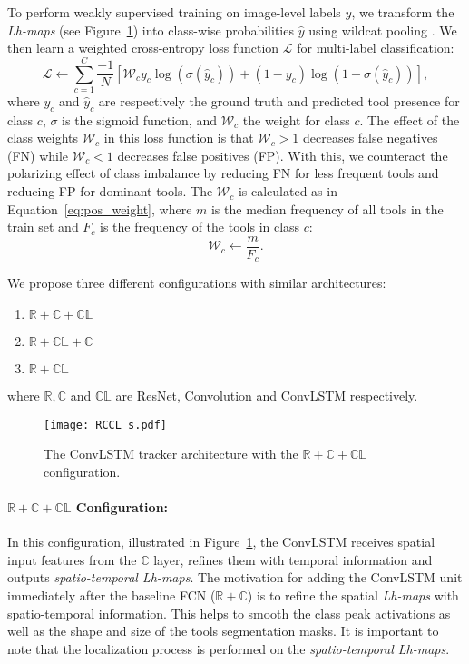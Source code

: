 \documentclass{svjour3}                     \smartqed
\newcommand{\bd}[1]{\textbf{#1}}
\begin{document}
To perform weakly supervised training on image-level labels $y$, we transform the \emph{Lh-maps} (see Figure~\ref{fig:RCCL}) into class-wise probabilities $\hat{y}$ using wildcat pooling \cite{cvpr:durand2017wildcat}.
We then learn a weighted cross-entropy loss function $\mathcal{L}$ for multi-label classification:
\begin{equation}\label{eq:loss}
\mathcal{L} \longleftarrow \sum_{c=1}^C\frac{-1}{N}\left [ \mathcal{W}_c y_c \log(\sigma(\hat{y}_c)) + (1-y_c) \log(1-\sigma(\hat{y}_c)) \right],
\end{equation}
where $y_c$ and $\hat{y}_c$ are respectively the ground truth and predicted tool presence for class $c$, $\sigma$ is the sigmoid function, and $\mathcal{W}_c$ the weight for class $c$. 
The effect of the class weights $\mathcal{W}_c$ in this loss function is that $\mathcal{W}_c > 1$ decreases false negatives (FN) while $\mathcal{W}_c < 1$ decreases false positives (FP). With this, we counteract the polarizing effect of class imbalance by reducing FN for less frequent tools and reducing FP for dominant tools. The $\mathcal{W}_c$ is calculated as in Equation~\ref{eq:pos_weight}, where $m$ is the median frequency of all tools in the train set and $F_c$ is the frequency of the tools in class $c$:
\begin{equation}\label{eq:pos_weight}
    \mathcal{W}_c \longleftarrow \frac{m}{F_c}.
\end{equation}

We propose three different configurations with similar architectures:
\begin{enumerate}
\item $\mathbb{R+C+CL}$
\item $\mathbb{R+CL+C}$
\item $\mathbb{R+CL}$
\end{enumerate}
where $\mathbb{R, C}$ and $\mathbb{CL}$ are ResNet, Convolution and ConvLSTM respectively.
\begin{figure}[t]\centering
        \texttt{[image: RCCL\_s.pdf]}
        \caption{The ConvLSTM tracker architecture with the $\mathbb{R+C+CL}$ configuration.}
    \label{fig:RCCL}
\end{figure}
\paragraph{$\mathbb{R+C+CL}$ \bd{Configuration}:} In this configuration, illustrated in Figure~\ref{fig:RCCL}, the ConvLSTM receives spatial input features from the $\mathbb{C}$ layer, refines them with temporal information and outputs \emph{spatio-temporal Lh-maps}. The motivation for adding the ConvLSTM unit immediately after the baseline FCN ($\mathbb{R+C}$) is to refine the spatial \emph{Lh-maps} with spatio-temporal information. This helps to smooth the class peak activations as well as the shape and size of the tools segmentation masks. It is important to note that the localization process is performed on the \textit{spatio-temporal Lh-maps}.
\end{document}
